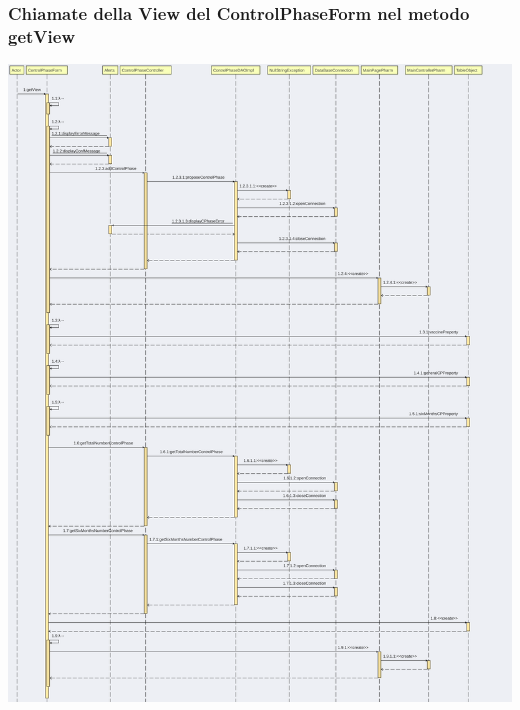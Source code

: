 \documentclass[11pt]{article}
\begin{document}
    \subsubsection*{Chiamate della View del ControlPhaseForm nel metodo getView}
    \begin{center}
        \includegraphics[width=1\textwidth]{pictures/prova.png}
    \end{center}

\newpage
\end{document}
